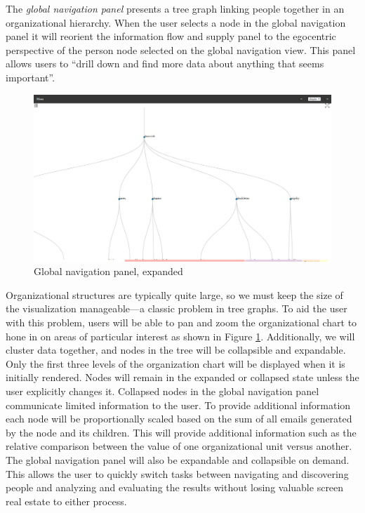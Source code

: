 \documentclass[12pt,letterpaper]{article}
\begin{document}
The \emph{global navigation panel} presents a tree graph linking people together in an organizational hierarchy. When the user selects a node in the global navigation panel it will reorient the information flow and supply panel to the egocentric perspective of the person node selected on the global navigation view. This panel allows users to “drill down and find more data about anything that seems important”\cite{ware2012information}.
\begin{figure}
  \centering
  \includegraphics[width=\columnwidth]{pics/expanded_app.jpg}
  \caption{Global navigation panel, expanded}
  \label{fig:global}
\end{figure}
Organizational structures are typically quite large, so we must keep the size of the visualization manageable---a classic problem in tree graphs\cite{herman2000graph}.  To aid the user with this problem, users will be able to pan and zoom the organizational chart to hone in on areas of particular interest as shown in Figure \ref{fig:global}.  Additionally, we will cluster data together, and nodes in the tree will be collapsible and expandable. Only the first three levels of the organization chart will be displayed when it is initially rendered.  Nodes will remain in the expanded or collapsed state unless the user explicitly changes it.  Collapsed nodes in the global navigation panel communicate limited information to the user.  To provide additional information each node will be proportionally scaled based on the sum of all emails generated by the node and its children.  This will provide additional information such as the relative comparison between the value of one organizational unit versus another.  The global navigation panel will also be expandable and collapsible on demand.  This allows the user to quickly switch tasks between navigating and discovering people and analyzing and evaluating the results without losing valuable screen real estate to either process.
\end{document}
